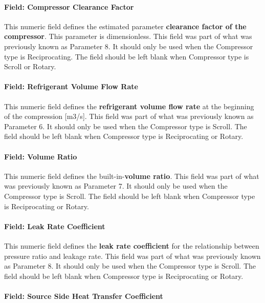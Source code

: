 \paragraph{Field: Compressor Clearance Factor}\label{field-compressor-clearance-factor}

This numeric field defines the estimated parameter \textbf{clearance factor of the compressor}. This parameter is dimensionless. This field was part of what was previously known as Parameter 8. It should only be used when the Compressor type is Reciprocating. The field should be left blank when Compressor type is Scroll or Rotary.

\paragraph{Field: Refrigerant Volume Flow Rate}\label{field-refrigerant-volume-flow-rate}

This numeric field defines the \textbf{refrigerant volume flow rate} at the beginning of the compression {[}m3/s{]}. This field was part of what was previously known as Parameter 6. It should only be used when the Compressor type is Scroll. The field should be left blank when Compressor type is Reciprocating or Rotary.

\paragraph{Field: Volume Ratio}\label{field-volume-ratio}

This numeric field defines the built-in-\textbf{volume ratio}. This field was part of what was previously known as Parameter 7. It should only be used when the Compressor type is Scroll. The field should be left blank when Compressor type is Reciprocating or Rotary.

\paragraph{Field: Leak Rate Coefficient}\label{field-leak-rate-coefficient}

This numeric field defines the \textbf{leak rate coefficient} for the relationship between pressure ratio and leakage rate. This field was part of what was previously known as Parameter 8. It should only be used when the Compressor type is Scroll. The field should be left blank when Compressor type is Reciprocating or Rotary.

\paragraph{Field: Source Side Heat Transfer Coefficient}\label{field-source-side-heat-transfer-coefficient}

